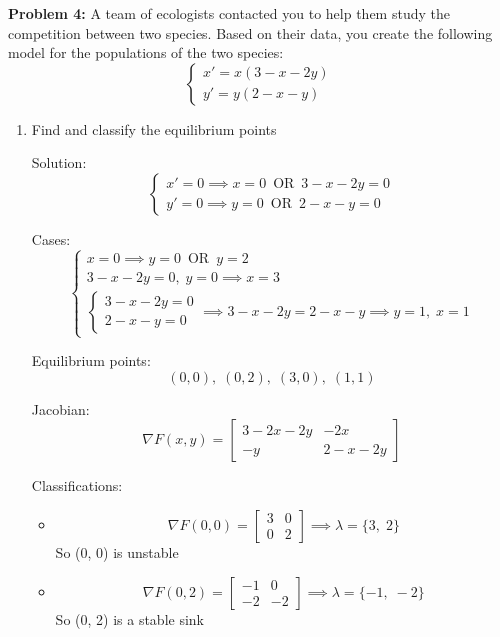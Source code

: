 \documentclass[12pt]{article}
\begin{document}
\pagebreak 

\textbf{Problem 4:} A team of ecologists contacted you to help them study the competition between two species. Based on their data, you create the following model for the populations of the two species:
\[\begin{cases}
    x' = x (3 - x -2y)\\
    y' = y(2 - x - y)
\end{cases}\]
\begin{enumerate}
    \item Find and classify the equilibrium points 
    
    Solution:
    \[\begin{cases}
        x' = 0 \implies x = 0 \,\text{ OR }\, 3 - x - 2y = 0\\
        y' = 0 \implies y = 0 \,\text{ OR }\, 2 - x- y = 0
    \end{cases}\]

    Cases:
    \[\begin{cases}
        x = 0 \implies y = 0 \, \text{ OR }\, y = 2\\
        3 - x - 2y = 0, \; y = 0 \implies x = 3\\
        \begin{cases}
            3 - x - 2y = 0\\
            2 - x - y = 0
        \end{cases} \implies 3 - x - 2y = 2 - x - y \implies y = 1, \; x = 1
    \end{cases}\]

    Equilibrium points:
    \[(0, 0), \; (0, 2), \; (3, 0), \; (1, 1)\]

    Jacobian:
    \[\nabla F(x, y) = \begin{bmatrix}
        3 - 2x - 2y & -2x\\
        -y & 2 - x - 2y
    \end{bmatrix}\]

    Classifications:
    \begin{itemize}
        \item \[\nabla F(0, 0) = \begin{bmatrix}
            3 & 0\\
            0 & 2
        \end{bmatrix} \implies \lambda = \{3, \; 2\}\]
        So (0, 0) is unstable

        \item \[\nabla F(0, 2) = \begin{bmatrix}
            -1 & 0\\
            -2 & -2
        \end{bmatrix} \implies \lambda = \{-1, \; -2\}\]
        So (0, 2) is a stable sink 


\end{itemize}
\end{enumerate}
\end{document}

